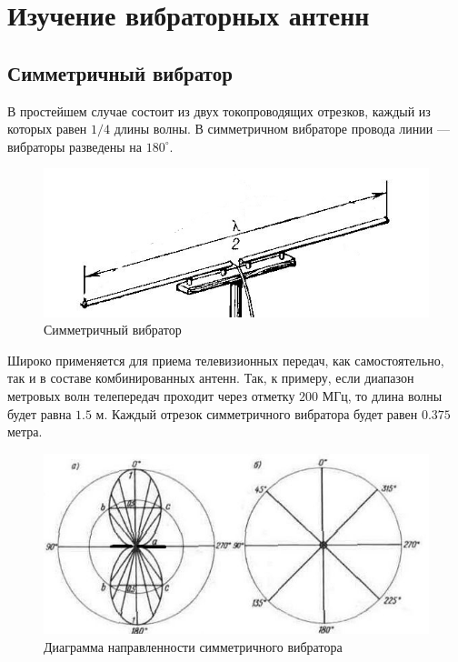 \section{Изучение вибраторных антенн}

\subsection{Симметричный вибратор}

В простейшем случае состоит из двух токопроводящих отрезков, каждый из которых равен $1/4$ длины волны. В симметричном вибраторе провода линии — вибраторы разведены на $180^{\circ}$.

\begin{figure}[H]
    \centering
    \includegraphics[width=.9\textwidth]{img/1.jpg}
    \caption{Симметричный вибратор}
\end{figure}

Широко применяется для приема телевизионных передач, как самостоятельно, так и в составе комбинированных антенн.
Так, к примеру, если диапазон метровых волн телепередач проходит через отметку $200$ МГц, то длина волны будет равна $1.5$ м.
Каждый отрезок симметричного вибратора будет равен $0.375$ метра.

\begin{figure}[H]
    \centering
    \includegraphics{img/2.jpg}
    \caption{Диаграмма направленности симметричного вибратора}
\end{figure}


